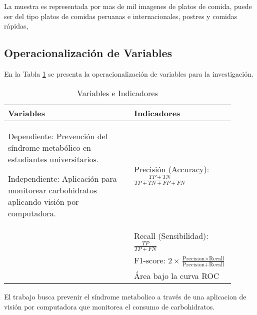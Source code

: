 La muestra es representada por mas de mil imagenes de platos de comida, puede ser del tipo platos de comidas peruanas e internacionales, postres y comidas rápidas, 

\subsection{Operacionalización de Variables}

En la Tabla \ref{3:table1} se presenta la operacionalización de variables para la investigación.

\begin{table}[h!]
  \centering
  \caption{Variables e Indicadores}
  \label{3:table1}
  \begin{tabular}{|p{0.5\linewidth}|p{0.4\linewidth}|}
    \hline
    \textbf{Variables} & \textbf{Indicadores} \\
    \hline
    Dependiente: Prevención del síndrome metabólico en estudiantes universitarios.
    
    \thinspace
    
    Independiente: Aplicación para monitorear carbohidratos aplicando visión por computadora.
    & \vspace{1mm} Precisión (Accuracy): $\frac{TP + TN}{TP + TN + FP + FN}$ \\
    & Recall (Sensibilidad): $\frac{TP}{TP + FN}$ \\
    & F1-score: $2 \times \frac{\text{Precision} \times \text{Recall}}{\text{Precision} + \text{Recall}}$ \\
    & Área bajo la curva ROC \\
    \hline
  \end{tabular}
\end{table}

El trabajo busca prevenir el síndrome metabolico  a través de una aplicacion de visión por computadora que monitorea el consumo de carbohidratos. 